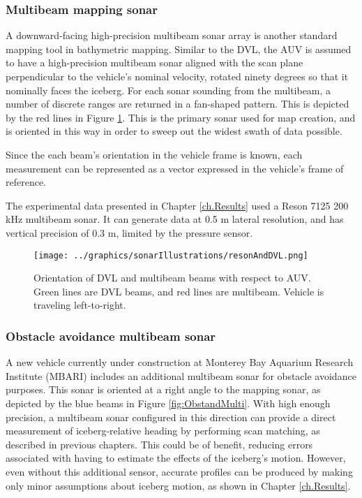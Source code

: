 \subsubsection{Multibeam mapping sonar}

A downward-facing high-precision multibeam sonar array is another standard mapping tool in bathymetric mapping. Similar to the DVL, the AUV is assumed to have a high-precision multibeam sonar aligned with the scan plane perpendicular to the vehicle's nominal velocity, rotated ninety degrees so that it nominally faces the iceberg. For each sonar sounding from the multibeam, a number of discrete ranges are returned in a fan-shaped pattern. This is depicted by the red lines in Figure \ref{fig:DVLandMulti}. This is the primary sonar used for map creation, and is oriented in this way in order to sweep out the widest swath of data possible. 

Since the each beam's orientation in the vehicle frame is known, each measurement can be represented as a vector expressed in the vehicle's frame of reference.

The experimental data presented in Chapter \ref{ch.Results} used a Reson 7125 200 kHz multibeam sonar. It can generate data at 0.5 m lateral resolution, and has vertical precision of 0.3 m, limited by the pressure sensor.

\begin{figure}[htb]
   \centering
   \texttt{[image: ../graphics/sonarIllustrations/resonAndDVL.png]} %
   \caption{Orientation of DVL and multibeam beams with respect to AUV. Green lines are DVL beams, and red lines are multibeam. Vehicle is traveling left-to-right.}
   \label{fig:DVLandMulti}
\end{figure}

\subsubsection{Obstacle avoidance multibeam sonar}

A new vehicle currently under construction at Monterey Bay Aquarium Research Institute (MBARI) includes an additional multibeam sonar for obstacle avoidance purposes. This sonar is oriented at a right angle to the mapping sonar, as depicted by the blue beams in Figure \ref{fig:ObstandMulti}. With high enough precision, a multibeam sonar configured in this direction can provide a direct measurement of iceberg-relative heading by performing scan matching, as described in previous chapters. This could be of benefit, reducing errors associated with having to estimate the effects of the iceberg's motion. However, even without this additional sensor, accurate profiles can be produced by making only minor assumptions about iceberg motion, as shown in Chapter \ref{ch.Results}.

